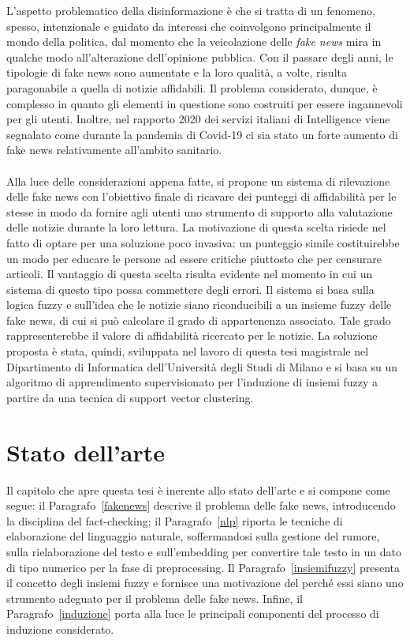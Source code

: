 \documentclass[12pt]{report}
\theoremstyle{definition}
\begin{document}
L'aspetto problematico della disinformazione è che si tratta di un fenomeno, spesso, intenzionale e guidato da interessi che coinvolgono principalmente il mondo della politica, dal momento che la veicolazione delle \textit{fake news} mira in qualche modo all'alterazione dell'opinione pubblica. 
Con il passare degli anni, le tipologie di fake news sono aumentate e la loro qualità, a volte, risulta paragonabile a quella di notizie affidabili. Il problema considerato, dunque, è complesso in quanto gli elementi in questione sono costruiti per essere ingannevoli per gli utenti.
Inoltre, nel rapporto 2020 dei servizi italiani di Intelligence viene segnalato come durante la pandemia di Covid-19 ci sia stato un forte aumento di fake news relativamente all'ambito sanitario.
\\
\\
Alla luce delle considerazioni appena fatte, si propone un sistema di rilevazione delle fake news con l'obiettivo finale di ricavare dei punteggi di affidabilità per le stesse in modo da fornire agli utenti uno strumento di supporto alla valutazione delle notizie durante la loro lettura.
La motivazione di questa scelta risiede nel fatto di optare per una soluzione poco invasiva: un punteggio simile costituirebbe un modo per educare le persone ad essere critiche piuttosto che per censurare articoli. Il vantaggio di questa scelta risulta evidente nel momento in cui un sistema di questo tipo possa commettere degli errori.
Il sistema si basa sulla logica fuzzy e sull'idea che le notizie siano riconducibili a un insieme fuzzy delle fake news, di cui si può calcolare il grado di appartenenza associato. Tale grado rappresenterebbe il valore di affidabilità ricercato per le notizie.
La soluzione proposta è stata, quindi, sviluppata nel lavoro di questa tesi magistrale nel Dipartimento di Informatica dell'Università degli Studi di Milano e si basa su un algoritmo di apprendimento supervisionato per l'induzione di insiemi fuzzy a partire da una tecnica di support vector clustering.

\chapter{Stato dell'arte}
\label{Capitolo 1}
\onehalfspacing

Il capitolo che apre questa tesi è inerente allo stato dell'arte e si compone come segue: il Paragrafo~\ref{fakenews} descrive il problema delle fake news, introducendo la disciplina del fact-checking; il Paragrafo~\ref{nlp} riporta le tecniche di elaborazione del linguaggio naturale, soffermandosi sulla gestione del rumore, sulla rielaborazione del testo e sull'embedding per convertire tale testo in un dato di tipo numerico per la fase di preprocessing. 
Il Paragrafo~\ref{insiemifuzzy} presenta il concetto degli insiemi fuzzy e fornisce una motivazione del perché essi siano uno strumento adeguato per il problema delle fake news.
Infine, il Paragrafo~\ref{induzione} porta alla luce le principali componenti del processo di induzione considerato.
\end{document}
